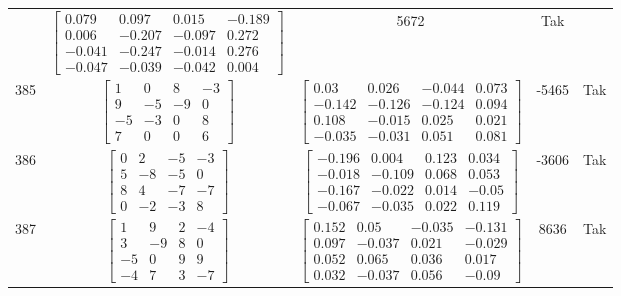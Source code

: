 \documentclass[a4paper,12pt]{article}
\begin{document}
\begin{tabular}{c c c c c}
&
$\begin{bmatrix} 0.079 & 0.097 & 0.015 & -0.189 \\ 0.006 & -0.207 & -0.097 & 0.272 \\ -0.041 & -0.247 & -0.014 & 0.276 \\ -0.047 & -0.039 & -0.042 & 0.004 \end{bmatrix}$
&
5672
&
Tak
\\
385
&
$\begin{bmatrix} 1 & 0 & 8 & -3 \\ 9 & -5 & -9 & 0 \\ -5 & -3 & 0 & 8 \\ 7 & 0 & 0 & 6 \end{bmatrix}$
&
$\begin{bmatrix} 0.03 & 0.026 & -0.044 & 0.073 \\ -0.142 & -0.126 & -0.124 & 0.094 \\ 0.108 & -0.015 & 0.025 & 0.021 \\ -0.035 & -0.031 & 0.051 & 0.081 \end{bmatrix}$
&
-5465
&
Tak
\\
386
&
$\begin{bmatrix} 0 & 2 & -5 & -3 \\ 5 & -8 & -5 & 0 \\ 8 & 4 & -7 & -7 \\ 0 & -2 & -3 & 8 \end{bmatrix}$
&
$\begin{bmatrix} -0.196 & 0.004 & 0.123 & 0.034 \\ -0.018 & -0.109 & 0.068 & 0.053 \\ -0.167 & -0.022 & 0.014 & -0.05 \\ -0.067 & -0.035 & 0.022 & 0.119 \end{bmatrix}$
&
-3606
&
Tak
\\
387
&
$\begin{bmatrix} 1 & 9 & 2 & -4 \\ 3 & -9 & 8 & 0 \\ -5 & 0 & 9 & 9 \\ -4 & 7 & 3 & -7 \end{bmatrix}$
&
$\begin{bmatrix} 0.152 & 0.05 & -0.035 & -0.131 \\ 0.097 & -0.037 & 0.021 & -0.029 \\ 0.052 & 0.065 & 0.036 & 0.017 \\ 0.032 & -0.037 & 0.056 & -0.09 \end{bmatrix}$
&
8636
&
Tak
\\

\end{tabular}
\end{document}
